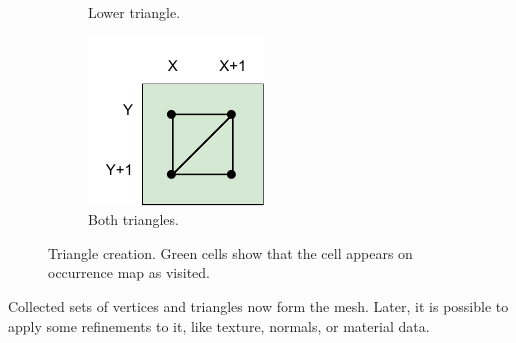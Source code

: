 \begin{figure}[ht]
\begin{subfigure}{0.3\textwidth}
        \caption{Lower triangle.}
        \label{fig:triangle_generation:lower}
    \end{subfigure}
    \begin{subfigure}{0.3\textwidth}
        \includegraphics[width=\textwidth]{triangles-full.pdf}
        \caption{Both triangles.}
    \end{subfigure}
    
    \caption{Triangle creation. Green cells show that the cell appears on occurrence map as visited.}
    \label{fig:triangle_generation}
\end{figure}

\begin{algorithm}
\end{algorithm}

Collected sets of vertices and triangles now form the mesh. Later, it is possible to apply some refinements to it, like texture, normals, or material data.

